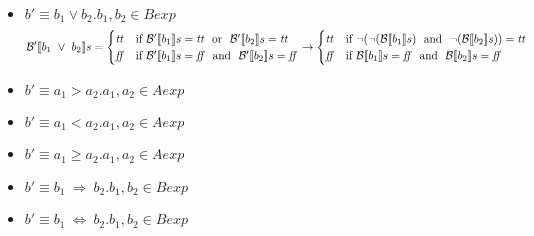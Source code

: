\begin{enumerate}[label=(\alph*)]
\begin{itemize}
    \item $ b' \equiv b_1 \lor b_2. b_1, b_2 \in Bexp$ \\
      \begin{align*}  
        \Bext{b_1 \ \lor \ b_2} = 
        \begin{cases} 
        \semtrue & 
        \mbox{if} \ \Bext{b_1} = \semtrue \ \mbox{ or } \ 
              \Bext{b_2} = \semtrue \\ 
        \semfalse & 
        \mbox{if} \ \Bext{b_1} = \semfalse \ \mbox{ and } \ 
              \Bext{b_2} = \semfalse \\ 
        \end{cases} 
        \rightarrow
        \begin{cases} 
        \semtrue & 
        \mbox{if} \ \lnot (\lnot (\B{b_1}) \ \mbox{ and } \ 
              \lnot (\B{b_2})) = \semtrue \\ 
        \semfalse & 
        \mbox{if} \ \B{b_1} = \semfalse \ \mbox{ and } \ 
              \B{b_2} = \semfalse \\ 
        \end{cases}
      \end{align*}
    \item $ b' \equiv a_1 > a_2. a_1, a_2 \in Aexp$ \\

    \item $ b' \equiv a_1 < a_2. a_1, a_2 \in Aexp$ \\

    \item $ b' \equiv a_1 \geq a_2. a_1, a_2 \in Aexp $ \\

    \item $ b' \equiv b_1 \ \Rightarrow \ b_2. b_1, b_2 \in Bexp $ \\

    \item $ b' \equiv b_1 \ \Leftrightarrow \ b_2. b_1, b_2 \in Bexp $ \\ 

  \end{itemize}
\end{enumerate}


